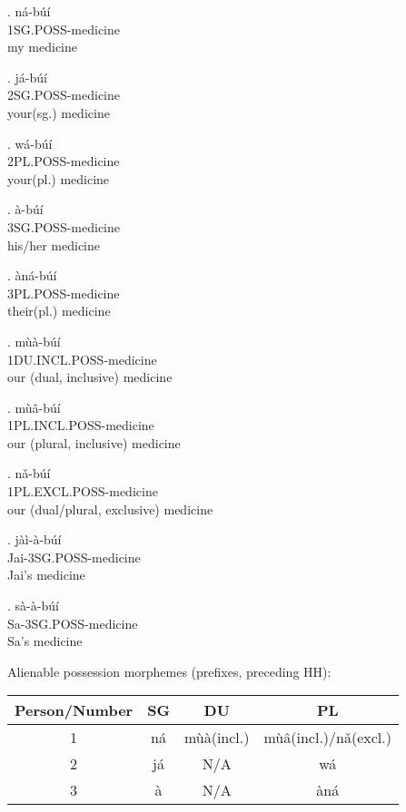 \documentclass{assets/fieldnotes}
\newcommand{\mb}[1]{\textcolor{Dandelion}{#1}}
\begin{document}
\exg. ná-búí\\
    1SG.POSS-medicine\\
    my medicine

\exg. já-búí\\
    2SG.POSS-medicine\\
    your(sg.) medicine

\exg. wá-búí\\
    2PL.POSS-medicine\\
    your(pl.) medicine

\ex. à-búí\\
    3SG.POSS-medicine\\
    his/her medicine

\ex. àná-búí\\
    3PL.POSS-medicine\\
    their(pl.) medicine

\ex. mùà-búí\\
    1DU.INCL.POSS-medicine\\
    our (dual, inclusive) medicine

\exg. mùâ-búí\\
    1PL.INCL.POSS-medicine\\
    our (plural, inclusive) medicine

\exg. nǎ-búí\\
    1PL.EXCL.POSS-medicine\\
    our (dual/plural, exclusive) medicine


\exg. jàì-à-búí\\
    Jai-3SG.POSS-medicine\\
    Jai's medicine

\exg. sà-à-búí\\
    Sa-3SG.POSS-medicine\\
    Sa's medicine


Alienable possession morphemes (prefixes, preceding HH):
\begin{center}
    \begin{tabular}{|c|c|c|c|}
    \hline
    Person/Number & SG & DU & PL \\ \hline
    1 & ná & m\mb{ùà}(incl.) & m\mb{ùâ}(incl.)/nǎ(excl.) \\ \hline
    2 & já & N/A & wá \\ \hline
    3 & à & N/A & àná \\ \hline
    \end{tabular}
\end{center}
\end{document}
